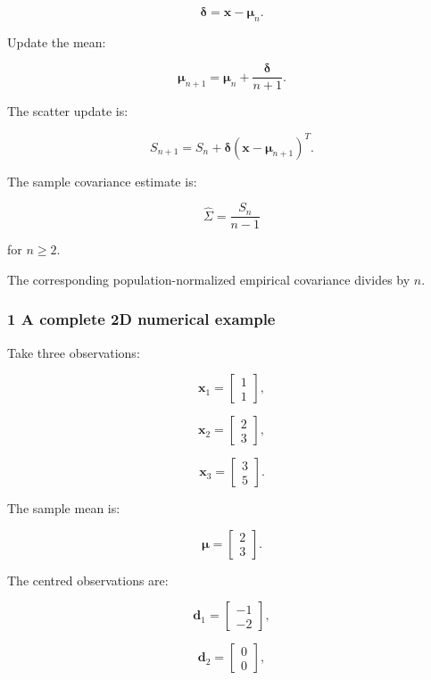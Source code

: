 \[
 \boldsymbol\delta=\mathbf x-\boldsymbol\mu_n.
\]

Update the mean:

\[
 \boxed{ \boldsymbol\mu_{n+1} = \boldsymbol\mu_n+ \frac{\boldsymbol\delta}{n+1} }.
\]

The scatter update is:

\[
 \boxed{ S_{n+1} = S_n+ \boldsymbol\delta (\mathbf x-\boldsymbol\mu_{n+1})^T }.
\]

The sample covariance estimate is:

\[
 \boxed{ \widehat\Sigma= \frac{S_n}{n-1} }
\]

for \(n\ge2\).

The corresponding population-normalized empirical covariance divides by \(n\).

\subsubsection{1 A complete 2D numerical example}\label{02-foundations-ii-ch031-a-complete-2d-numerical-example}

\hypertarget{02-foundations-ii-ch031-a-complete-2d-numerical-example}{}

Take three observations:

\[
 \mathbf x_1= \begin{bmatrix}1\\1\end{bmatrix},
\]

\[
 \mathbf x_2= \begin{bmatrix}2\\3\end{bmatrix},
\]

\[
 \mathbf x_3= \begin{bmatrix}3\\5\end{bmatrix}.
\]

The sample mean is:

\[
 \boldsymbol\mu= \begin{bmatrix}2\\3\end{bmatrix}.
\]

The centred observations are:

\[
 \mathbf d_1= \begin{bmatrix}-1\\-2\end{bmatrix},
\]

\[
 \mathbf d_2= \begin{bmatrix}0\\0\end{bmatrix},
\]

